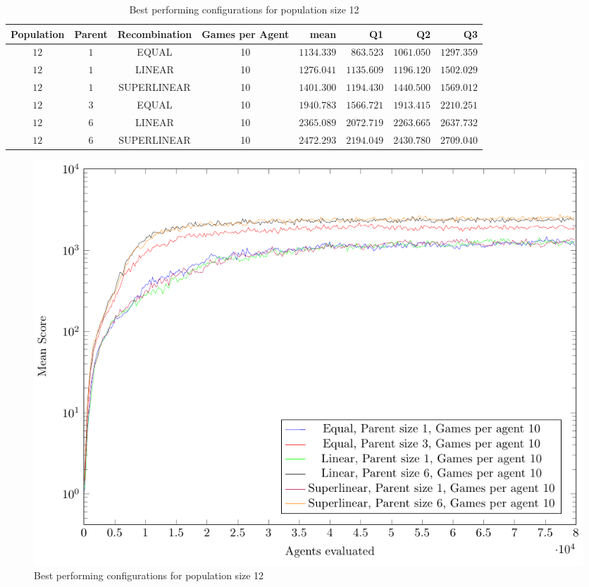 \begin{table}[H]
\centering
\small
\begin{tabular}{c c c c r r r r}
Population & Parent & Recombination & Games per Agent & mean & Q1 & Q2 & Q3\\
\hline
$12$ & $1$ & EQUAL & 10 & $1134.339$ & $863.523$ & $1061.050$ & $1297.359$\\
$12$ & $1$ & LINEAR & 10 & $1276.041$ & $1135.609$ & $1196.120$ & $1502.029$\\
$12$ & $1$ & SUPERLINEAR & 10 & $1401.300$ & $1194.430$ & $1440.500$ & $1569.012$\\
$12$ & $3$ & EQUAL & 10 & $1940.783$ & $1566.721$ & $1913.415$ & $2210.251$\\
$12$ & $6$ & LINEAR & 10 & $2365.089$ & $2072.719$ & $2263.665$ & $2637.732$\\
$12$ & $6$ & SUPERLINEAR & 10 & $2472.293$ & $2194.049$ & $2430.780$ & $2709.040$\\
\end{tabular}
\caption{Best performing configurations for population size 12}
\end{table}

\begin{figure}[H]
\centering
\caption{Best performing configurations for population size 12}
\includegraphics[scale=1]{data/cma_population_offspring/bestofeach_population/12x/PlotFile.pdf}
\end{figure}

\clearpage

